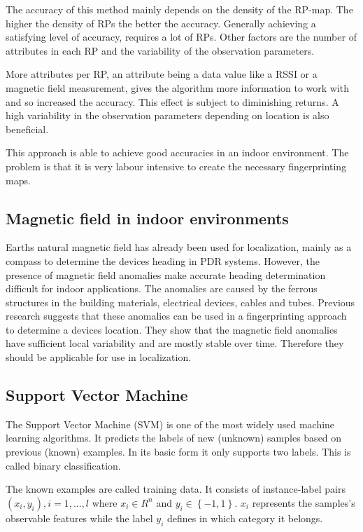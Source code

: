 The accuracy of this method mainly depends on the density of the RP-map. The higher the density of RPs the better the accuracy. Generally achieving a satisfying level of accuracy, requires a lot of RPs. Other factors are the number of attributes in each RP and the variability of the observation parameters.

More attributes per RP, an attribute being a data value like a RSSI or a magnetic field measurement, gives the algorithm more information to work with and so increased the accuracy\cite{Li2012feasableMagnetic}. This effect is subject to diminishing returns\cite{brouwers2014incremental}. A high variability in the observation parameters depending on location is also beneficial.

This approach is able to achieve good accuracies in an indoor environment. The problem is that it is very labour intensive to create the necessary fingerprinting maps.

\subsection{Magnetic field in indoor environments}

Earths natural magnetic field has already been used for localization, mainly as a compass to determine the devices heading in PDR systems. However, the presence of magnetic field anomalies make accurate heading determination difficult for indoor applications. The anomalies are caused by the ferrous structures in the building materials, electrical devices, cables and tubes. Previous research suggests that these anomalies can be used in a fingerprinting approach to determine a devices location\cite{haverinen2009global,angermann2012CharacterizationMagnetic,Li2012feasableMagnetic}. They show that the magnetic field anomalies have sufficient local variability and are mostly stable over time. Therefore they should be applicable for use in localization.

\subsection{Support Vector Machine}
The Support Vector Machine (SVM) is one of the most widely used machine learning algorithms. It predicts the labels of new (unknown) samples based on previous (known) examples. In its basic form it only supports two labels. This is called binary classification.

The known examples are called training data. It consists of instance-label pairs \(\left ( x_{i}, y_{i} \right ), i=1,...,l\) where \(x_{i}\in R^{n}\) and \(y_{i}\in \left \{ -1,1 \right \}\). \(x_{i}\) represents the samples's observable features while the label \(y_{i}\) defines in which category it belongs.

